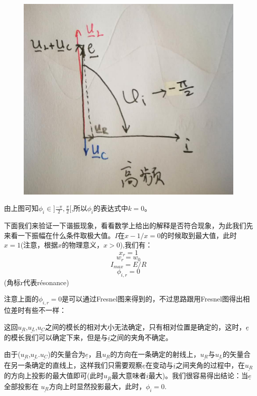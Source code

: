 \documentclass[12pt]{book}
\theoremstyle{definition}\newtheorem{dfn}{Définition}[chapter]
\theoremstyle{plain}\newtheorem{thm}{Théorème}[chapter]
\theoremstyle{plain}\newtheorem{prp}{Proposition}[chapter]
\theoremstyle{plain}\newtheorem{lem}{\bf Lemme}[chapter]
\theoremstyle{plain}\newtheorem{axm}{\bf Axiome}[chapter]
\theoremstyle{plain}\newtheorem{lmm}{\bf Lemme}[chapter]
\theoremstyle{plain}\newtheorem{cor}{\bf Corollaire}[chapter]
\theoremstyle{remark}\newtheorem{rem}{Remarque}[chapter]
\begin{document}
\begin{figure}[H]
	\centering
	\includegraphics[scale=0.2]{Etude du circuit RLC serie-Resonances//5}
\end{figure}
由上图可知$\phi_{i}\in ]\frac{-\pi}{2},\frac{\pi}{2}[$,所以$\phi_{i}$的表达式中$k=0$。

下面我们来验证一下谐振现象，看看数学上给出的解释是否符合现象，为此我们先来看一下振幅在什么条件取极大值。$I$在$x-1/x=0$的时候取到最大值，此时$x=1$(注意，根据$x$的物理意义，$x>0$),我们有：
$$
x_r=1
$$
$$
w_r=w_0
$$
$$
I_{max}=E/R
$$
$$
\phi_{i,r}=0
$$
\quad \quad \quad \quad \quad \quad \quad \quad \quad \quad \quad \quad (角标r代表résonance)

注意上面的$\phi_{i,r}=0$是可以通过Fresnel图来得到的，不过思路跟用Fresnel图得出相位差时有些不一样：

这回$\underline{u_R}$,$\underline{u_L}$,$\underline{u_C}$之间的模长的相对大小无法确定，只有相对位置是确定的，这时，$\underline{e}$的模长我们可以确定下来，但是与$\underline{i}$之间的夹角不确定。

由于($\underline{u_R}$,$\underline{u_L}$.$\underline{u_C}$)的矢量合为$\underline{e}$，且$\underline{u_R}$的方向在一条确定的射线上，$\underline{u_R}$与$\underline{u_L}$的矢量合在另一条确定的直线上，这样我们只需要观察$\underline{e}$在变动与$\underline{i}$之间夹角的过程中，在$\underline{u_R}$的方向上投影的最大值即可(此时$\underline{u_R}$最大意味者$\underline{i}$最大)。我们很容易得出结论：当$\underline{e}$全部投影在
$\underline{u_R}$方向上时显然投影最大，此时，$\phi_{i}=0$.
\end{document}

